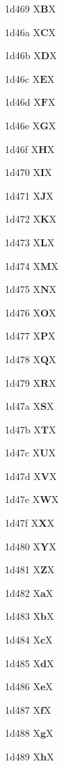 \documentclass[11pt]{article}
\begin{document}
1d469 X{\ensuremath{\boldsymbol{B}}}X

1d46a X{\ensuremath{\boldsymbol{C}}}X

1d46b X{\ensuremath{\boldsymbol{D}}}X

1d46c X{\ensuremath{\boldsymbol{E}}}X

1d46d X{\ensuremath{\boldsymbol{F}}}X

1d46e X{\ensuremath{\boldsymbol{G}}}X

1d46f X{\ensuremath{\boldsymbol{H}}}X

1d470 X{\ensuremath{\boldsymbol{I}}}X

1d471 X{\ensuremath{\boldsymbol{J}}}X

1d472 X{\ensuremath{\boldsymbol{K}}}X

1d473 X{\ensuremath{\boldsymbol{L}}}X

1d474 X{\ensuremath{\boldsymbol{M}}}X

1d475 X{\ensuremath{\boldsymbol{N}}}X

1d476 X{\ensuremath{\boldsymbol{O}}}X

1d477 X{\ensuremath{\boldsymbol{P}}}X

1d478 X{\ensuremath{\boldsymbol{Q}}}X

1d479 X{\ensuremath{\boldsymbol{R}}}X

1d47a X{\ensuremath{\boldsymbol{S}}}X

1d47b X{\ensuremath{\boldsymbol{T}}}X

1d47c X{\ensuremath{\boldsymbol{U}}}X

1d47d X{\ensuremath{\boldsymbol{V}}}X

1d47e X{\ensuremath{\boldsymbol{W}}}X

1d47f X{\ensuremath{\boldsymbol{X}}}X

1d480 X{\ensuremath{\boldsymbol{Y}}}X

1d481 X{\ensuremath{\boldsymbol{Z}}}X

1d482 X{\ensuremath{\boldsymbol{a}}}X

1d483 X{\ensuremath{\boldsymbol{b}}}X

1d484 X{\ensuremath{\boldsymbol{c}}}X

1d485 X{\ensuremath{\boldsymbol{d}}}X

1d486 X{\ensuremath{\boldsymbol{e}}}X

1d487 X{\ensuremath{\boldsymbol{f}}}X

1d488 X{\ensuremath{\boldsymbol{g}}}X

1d489 X{\ensuremath{\boldsymbol{h}}}X
\end{document}
